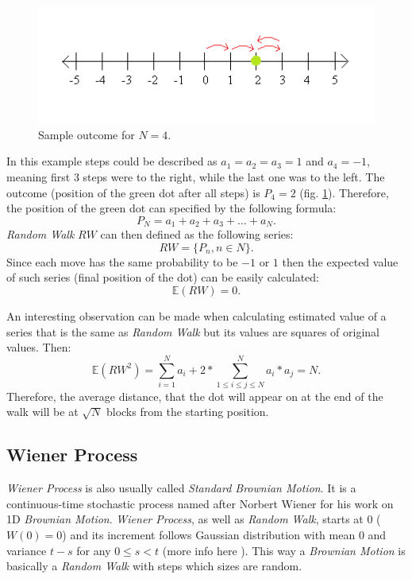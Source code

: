         \begin{figure}[H]
            \centering
            \includegraphics{img/numberLine_end.png}
            \caption{Sample outcome for $N=4$.}
            \label{fig:numberLine_end}
        \end{figure}
        In this example steps could be described as $a_1 = a_2 = a_3 = 1$ and $a_4 = -1$, meaning first 3 steps were to the right, while the last one was to the left. The outcome (position of the green dot after all steps) is $P_4 = 2$ (fig. \ref{fig:numberLine_end}).
        Therefore, the position of the green dot can specified by the following formula:
        \[  %
        P_N = a_1 + a_2 + a_3 + \ldots + a_N
        .
        \]
        \textit{Random Walk} $RW$ can then defined as the following series:
        \[
        RW = \{P_n, n \in N\}
        .
        \]
        Since each move has the same probability to be $-1$ or $1$ then the expected value of such series (final position of the dot) can be easily calculated:
        \[
        \mathbb{E}(RW) = 0
        .
        \]
        
        An interesting observation can be made when calculating estimated value of a series that is the same as \textit{Random Walk} but its values are squares of original values.
        Then:
        \[
        \mathbb{E}({RW}^2) = \sum_{i=1}^{N} a_{i} + 2*\sum_{1 \leq i \leq j \leq N}^{N} a_{i}*a_{j} = N
        .
        \]
        Therefore, the average distance, that the dot will appear on at the end of the walk will be at \(\sqrt{N}\) blocks from the starting position.
        
    \subsection{Wiener Process}
        \textit{Wiener Process} is also usually called \textit{Standard Brownian Motion}. It is a continuous-time stochastic process named after Norbert Wiener for his work on 1D \textit{Brownian Motion}.
        \textit{Wiener Process}, as well as \textit{Random Walk}, starts at 0 (\( W(0) = 0 \)) and its increment follows Gaussian distribution with mean \(0\) and variance \(t-s\) for any \(0\leq s < t \) (more info here \cite{wienerProcess}).
        This way a \textit{Brownian Motion} is basically a \textit{Random Walk} with steps which sizes are random.
